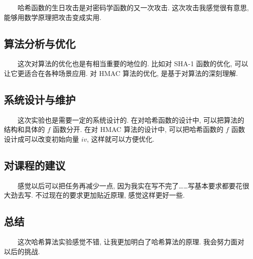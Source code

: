 \documentclass[12pt,a4paper]{article}
\begin{document}
　　哈希函数的生日攻击是对密码学函数的又一次攻击. 这次攻击我感觉很有意思, 能够用数学原理把攻击变成实用. 

\subsection*{算法分析与优化}

　　这次对算法的优化也是有相当重要的地位的. 比如对 SHA-1 函数的优化, 可以让它更适合在各种场景应用. 对 HMAC 算法的优化, 是基于对算法的深刻理解. 

\subsection*{系统设计与维护}

　　这次实验也是需要一定的系统设计的. 在对哈希函数的设计中, 可以把算法的结构和具体的 $ f $ 函数分开. 在对 HMAC 算法的设计中, 可以把哈希函数的 $ f $ 函数设计成可以改变初始向量 $ iv $, 这样就可以方便优化. 

\subsection*{对课程的建议}

　　感觉以后可以把任务再减少一点, 因为我实在写不完了……写基本要求都要花很大劲去写. 不过现在的要求更加贴近原理, 感觉这样更好一些. 

\subsection*{总结}

　　这次哈希算法实验感觉不错, 让我更加明白了哈希算法的原理. 我会努力面对以后的挑战. 
\end{document}
